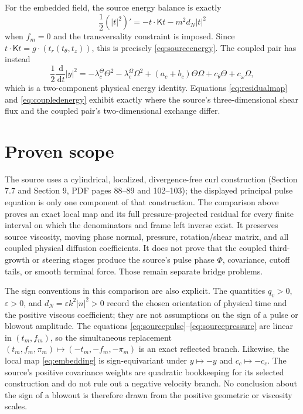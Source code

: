 \documentclass[11pt]{article}
\newcommand{\dd}{\,\mathrm d}
\begin{document}
For the embedded field, the source energy balance is exactly
\begin{equation}
 \frac12(|t|^2)'=-t\cdot\mathsf Kt-m^2d_N|t|^2
\end{equation}
when $f_m=0$ and the transversality constraint is imposed.  Since
$t\cdot\mathsf Kt=g\cdot(t_r(t_\theta,t_z))$, this is precisely
\eqref{eq:sourceenergy}.  The coupled pair has instead
\begin{equation}
 \frac12\frac{\dd}{\dd t}|y|^2
 =-\lambda_c^\Theta\Theta^2-\lambda_c^\Omega\Omega^2
 +(a_c+b_c)\Theta\Omega+c_\theta\Theta+c_\omega\Omega,
 \label{eq:coupledenergy}
\end{equation}
which is a two-component physical energy identity.  Equations
\eqref{eq:residualmap} and \eqref{eq:coupledenergy} exhibit exactly where the
source's three-dimensional shear flux and the coupled pair's two-dimensional
exchange differ.

\section{Proven scope}
The source uses a cylindrical, localized, divergence-free curl construction
(Section 7.7 and Section 9, PDF pages 88--89 and 102--103); the displayed
principal pulse equation is only one component of that construction.  The
comparison above proves an exact local map and its full pressure-projected
residual for every finite interval on which the denominators and frame left
inverse exist.  It preserves source viscosity, moving phase normal, pressure,
rotation/shear matrix, and all coupled physical diffusion coefficients.  It does
not prove that the coupled third-growth or steering stages produce the source's
pulse phase $\Phi$, covariance, cutoff tails, or smooth terminal force.  Those
remain separate bridge problems.

The sign conventions in this comparison are also explicit.  The quantities
$q_v>0$, $\varepsilon>0$, and $d_N=\varepsilon k^2|n|^2>0$ record the chosen
orientation of physical time and the positive viscous coefficient; they are
not assumptions on the sign of a pulse or blowout amplitude.  The equations
\eqref{eq:sourcepulse}--\eqref{eq:sourcepressure} are linear in $(t_m,f_m)$,
so the simultaneous replacement $(t_m,f_m,\pi_m)\mapsto
(-t_m,-f_m,-\pi_m)$ is an exact reflected branch.  Likewise, the local map
\eqref{eq:embedding} is sign-equivariant under $y\mapsto-y$ and
$c_c\mapsto-c_c$.  The source's positive covariance weights are quadratic
bookkeeping for its selected construction and do not rule out a negative
velocity branch.  No conclusion about the sign of a blowout is therefore
drawn from the positive geometric or viscosity scales.
\end{document}
